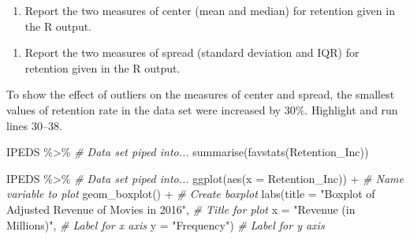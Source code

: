 \documentclass[
]{report}
\newenvironment{Shaded}{\begin{snugshade}}{\end{snugshade}}
\newcommand{\AttributeTok}[1]{\textcolor[rgb]{0.77,0.63,0.00}{#1}}
\newcommand{\CommentTok}[1]{\textcolor[rgb]{0.56,0.35,0.01}{\textit{#1}}}
\newcommand{\FunctionTok}[1]{\textcolor[rgb]{0.00,0.00,0.00}{#1}}
\newcommand{\NormalTok}[1]{#1}
\newcommand{\SpecialCharTok}[1]{\textcolor[rgb]{0.00,0.00,0.00}{#1}}
\newcommand{\StringTok}[1]{\textcolor[rgb]{0.31,0.60,0.02}{#1}}
\providecommand{\tightlist}{%
  \setlength{\itemsep}{0pt}\setlength{\parskip}{0pt}}
\begin{document}
\begin{enumerate}
\def\labelenumi{\arabic{enumi}.}
\setcounter{enumi}{7}
\tightlist
\item
  Report the two measures of center (mean and median) for retention given in the R output.
\end{enumerate}

\vspace{0.8in}

\begin{enumerate}
\def\labelenumi{\arabic{enumi}.}
\setcounter{enumi}{8}
\tightlist
\item
  Report the two measures of spread (standard deviation and IQR) for retention given in the R output.
\end{enumerate}

\vspace{0.8in}

\newpage

To show the effect of outliers on the measures of center and spread, the smallest values of retention rate in the data set were increased by 30\%. Highlight and run lines 30--38.

\begin{Shaded}
\begin{Highlighting}[]
\NormalTok{IPEDS }\SpecialCharTok{\%\textgreater{}\%} \CommentTok{\# Data set piped into...}
  \FunctionTok{summarise}\NormalTok{(}\FunctionTok{favstats}\NormalTok{(Retention\_Inc))}
\end{Highlighting}
\end{Shaded}

\begin{Shaded}
\begin{Highlighting}[]
\NormalTok{IPEDS }\SpecialCharTok{\%\textgreater{}\%} \CommentTok{\# Data set piped into...}
  \FunctionTok{ggplot}\NormalTok{(}\FunctionTok{aes}\NormalTok{(}\AttributeTok{x =}\NormalTok{ Retention\_Inc)) }\SpecialCharTok{+}   \CommentTok{\# Name variable to plot}
  \FunctionTok{geom\_boxplot}\NormalTok{() }\SpecialCharTok{+}  \CommentTok{\# Create boxplot}
  \FunctionTok{labs}\NormalTok{(}\AttributeTok{title =} \StringTok{"Boxplot of Adjusted Revenue of Movies in 2016"}\NormalTok{, }\CommentTok{\# Title for plot}
       \AttributeTok{x =} \StringTok{"Revenue (in Millions)"}\NormalTok{, }\CommentTok{\# Label for x axis}
       \AttributeTok{y =} \StringTok{"Frequency"}\NormalTok{) }\CommentTok{\# Label for y axis}
\end{Highlighting}
\end{Shaded}
\end{document}
